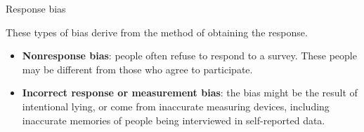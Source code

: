 \documentclass[handout]{beamer}
\begin{document}
\begin{frame}{Response bias}
\scriptsize{
These types of bias derive from the method of obtaining the response.

\begin{itemize}
 \item \textbf{Nonresponse bias}: people often refuse to respond to a survey. These people may be different from those who agree to participate.
 
 \item \textbf{Incorrect response or measurement bias}: the bias might be the result of intentional lying, or come from inaccurate measuring devices, including inaccurate memories of people being interviewed in self-reported data.
 \begin{itemize}
 \end{itemize}

 
 
\end{itemize}


} 
\end{frame}
\end{document}
